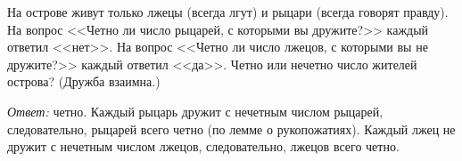 \problem
На острове живут только лжецы (всегда лгут) и рыцари (всегда говорят правду).
На вопрос <<Четно ли число рыцарей, с которыми вы дружите?>> каждый ответил
<<нет>>.
На вопрос <<Четно ли число лжецов, с которыми вы не дружите?>> каждый ответил
<<да>>.
Четно или нечетно число жителей острова?
(Дружба взаимна.)

\solution
\emph{Ответ:} четно.
Каждый рыцарь дружит с нечетным числом рыцарей, следовательно, рыцарей всего
четно (по лемме о рукопожатиях).
Каждый лжец не дружит с нечетным числом лжецов, следовательно, лжецов всего
четно.

\endproblem
